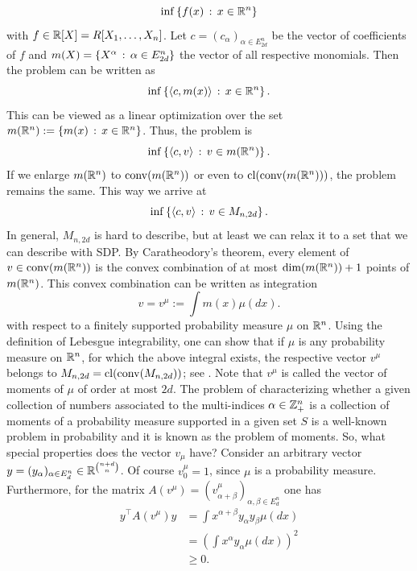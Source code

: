 \begin{equation}
	\label{our:inf:problem}
	\inf \left\{ f(x)  \,:\, x \in \mathbb{R}^n \right\}
\end{equation}
with $f \in \mathbb{R}[X]=R[X_1,\ldots,X_n]$. Let $c = (c_\alpha)_{\alpha \in E_{2d}^n}$ be the vector of coefficients of $f$ and $m(X) = \left\{  X^\alpha  \,:\, \alpha \in E_{2d}^n \right\}$ the vector of all respective monomials. Then the problem can be written as 
\begin{equation}
	\inf \left\{  \left\langle c , m(x) \right\rangle  \,:\, x \in \mathbb{R}^n \right\}.
\end{equation}
This can be viewed as a linear optimization over the set $m(\mathbb{R}^n):=\left\{ m(x) \,:\, x \in \mathbb{R}^n \right\}$. Thus, the problem is
\begin{equation}
	\inf \left\{ \left\langle c , v \right\rangle \,:\, v \in m(\mathbb{R}^n) \right\}.
\end{equation}
If we enlarge $m(\mathbb{R}^n)$ to $\operatorname{conv}(m(\mathbb{R}^n))$ or even to $\operatorname{cl}(\operatorname{conv}(m(\mathbb{R}^n)))$, the problem remains the same. This way we arrive at 
\begin{equation}
	\label{lin:probl:on:M}
	\inf \left\{ \left\langle c , v \right\rangle \,:\,  v \in M_{n,2d} \right\}.
\end{equation}
In general, $M_{n,2d}$ is hard to describe, but at least we can relax it to a set that we can describe with SDP. By Caratheodory's theorem, every element of $v \in \operatorname{conv}(m(\mathbb{R}^n))$ is the convex combination of at most $\dim(m(\mathbb{R}^n))+1$ points of $m(\mathbb{R}^n)$. This convex combination can be written as integration 
\[
	v = v^\mu:= \int m(x) \mu( d x).
\]
with respect to a finitely supported probability measure $\mu$ on $\mathbb{R}^n$. Using the definition of Lebesgue integrability, one can show that if $\mu$ is any probability measure on $\mathbb{R}^n$, for which the above integral exists, the respective vector $v^\mu$ belongs to $M_{n,2d}=\operatorname{cl}(\operatorname{conv}(M_{n,2d}))$; see \cite[Definitions~11.21, 11.22]{Rudin}. Note that $v^\mu$ is called the vector of moments of $\mu$ of order at most $2d$. The problem of characterizing whether a given collection of numbers associated to the multi-indices $\alpha \in \mathbb{Z}_+^n$ is a collection of moments of a probability measure supported in a given set $S$ is a well-known problem in probability and it is known as the problem of moments. So, what special properties does the vector $v_\mu$ have? Consider an arbitrary vector $y=(y_\alpha)_{\alpha \in E_d^n} \in \mathbb{R}^{\binom{n+d}{n}}$. Of course $v^\mu_0=1$, since $\mu$ is a probability measure. Furthermore, for the matrix $A(v^\mu) = (v^\mu_{\alpha+\beta})_{\alpha,\beta \in E_d^n}$ one has
\begin{align*}
	y^\top A(v^\mu) y & = \int x^{\alpha + \beta} y_\alpha y_\beta \mu(d x)
	\\ & = \left( \int x^\alpha y_\alpha \mu(d x)\right)^2 
	\\ & \ge 0.
\end{align*}
